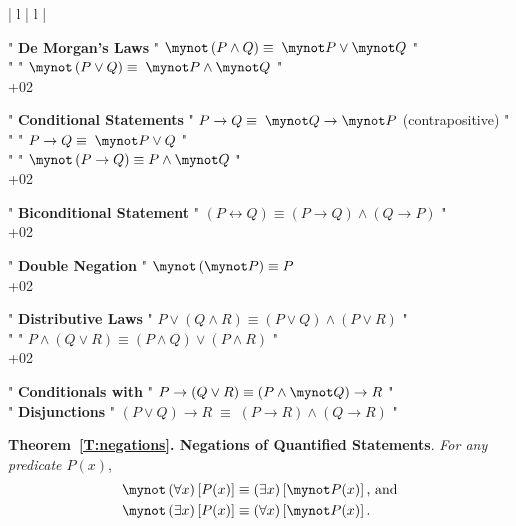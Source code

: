 \BeginTable
\BeginFormat
| l | l |
\EndFormat

" \textbf{De Morgan's Laws}   "  $\mynot  \left( {P \wedge Q} \right) \equiv \;\mynot  P \vee \mynot  Q$ " \\ 
 "                       " $\mynot  \left( {P \vee Q} \right) \equiv \;\mynot  P \wedge \mynot  Q$ " \\+02

" \textbf{Conditional Statements} "  $P \to Q \equiv \;\mynot  Q \to \mynot  P$  (contrapositive) " \\
"   "  $P \to Q \equiv \;\mynot  P \vee Q$ " \\
"   "  $\mynot  \left( {P \to Q} \right) \equiv P \wedge \mynot  Q$ " \\+02

" \textbf{Biconditional Statement} "  
$\left( {P \leftrightarrow Q} \right) \equiv \left( {P \to Q} \right) \wedge \left( {Q \to P} \right)$ " \\+02

" \textbf{Double Negation} "  $\mynot  \left( {\mynot  P} \right) \equiv P$ \\+02

" \textbf{Distributive Laws} "  
$P \vee \left( {Q \wedge R} \right) \equiv \left( {P \vee Q} \right) \wedge \left( {P \vee R} \right)$  " \\
"   "  $P \wedge \left( {Q \vee R} \right) \equiv \left( {P \wedge Q} \right) \vee \left( {P \wedge R} \right)$ " \\+02

" \textbf{Conditionals with}  " $P \to \left( {Q \vee R} \right) \equiv \left( {P \wedge \mynot  Q} \right) \to R$ " \\
" \textbf{Disjunctions}    "  $\left( {P \vee Q} \right) \to R\; \equiv \;\left( {P \to R} \right) \wedge \left( {Q \to R} \right)$ " \\
\EndTable

\quarter
\noindent
\textbf{Theorem~\ref{T:negations}. Negations of Quantified Statements}.    
\emph{For any predicate  $P\left( x \right)$},
\[
\begin{aligned}
  \mynot  \left( {\forall x} \right)\left[ {P( x )} \right] &\equiv \left( {\exists x} \right)\left[ {\mynot  P( x )} \right]\text{, and} \\ 
  \mynot  \left( {\exists x} \right)\left[ {P( x )} \right] &\equiv \left( {\forall x} \right)\left[ {\mynot  P( x )} \right]. \\ 
\end{aligned}
\]
\hbreak

